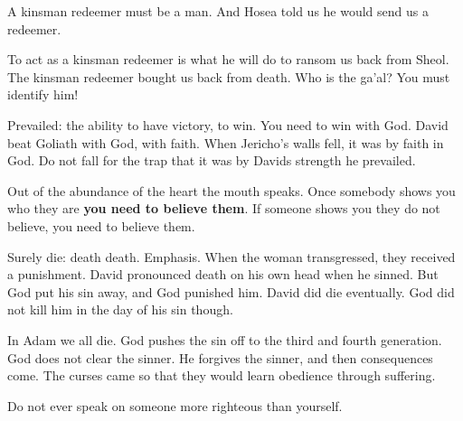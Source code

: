 \documentclass[12pt]{article}
\begin{document}
	\begin{quote}
		\BibleDeuteronomyThirtyTwoTwenty{}
	\end{quote}

	A kinsman redeemer must be a man. And Hosea told us he would send
	us a redeemer.

	\begin{quote}
		\BibleHoseaThirteenFourteen{}
	\end{quote}

	To act as a kinsman redeemer is what he will do to ransom us
	back from Sheol. The kinsman redeemer bought us back from
	death. Who is the ga'al? You must identify him!

	\begin{quote}
		\BibleHoseaTwelveThree{}
		\BibleHoseaTwelveFour{}
	\end{quote}

	Prevailed: the ability to have victory, to win. You need to win
	with God. David beat Goliath with God, with faith. When Jericho's
	walls fell, it was by faith in God. Do not fall for the trap that
	it was by Davids strength he prevailed.

	Out of the abundance of the heart the mouth speaks. Once somebody
	shows you who they are \textbf{you need to believe them}. If
	someone shows you they do not believe, you need to believe them.

	\begin{quote}
		\BibleGenesisThreeOne{}
		\BibleGenesisThreeTwo{}
		\BibleGenesisThreeThree{}
		\BibleGenesisThreeFour{}
	\end{quote}

	\begin{quote}
		\BibleGenesisTwoSeven{}
	\end{quote}

	Surely die: death death. Emphasis. When the woman transgressed,
	they received a punishment. David pronounced death on his own
	head when he sinned. But God put his sin away, and God punished
	him. David did die eventually. God did not kill him in the day
	of his sin though.

	In Adam we all die. God pushes the sin off to the third and fourth
	generation. God does not clear the sinner. He forgives the sinner,
	and then consequences come. The curses came so that they would 
	learn obedience through suffering.

	Do not ever speak on someone more righteous than yourself.

	\begin{quote}
		\BibleSongOfSolomonEightOne{}
		\BibleSongOfSolomonEightTwo{}
		\BibleSongOfSolomonEightThree{}
		\BibleSongOfSolomonEightFour{}
		\BibleSongOfSolomonEightFive{}
		\BibleSongOfSolomonEightSix{}
	\end{quote}
\end{document}
